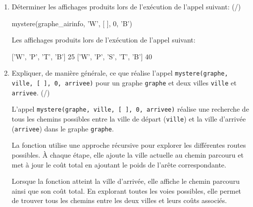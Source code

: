 \begin{enumerate}[resume=monDS]
    \item Déterminer les affichages produits lors de l'exécution de l'appel suivant: (/)
\begin{CodePythontexAlt}[TaillePolice=\large, Largeur=1\linewidth,Centre,Lignes=true,PremLigne=1]{}
mystere(graphe_airinfo, 'W', [ ], 0, 'B')
\end{CodePythontexAlt}
\begin{blocvisible}[height=3]
    Les affichages produits lors de l'exécution de l'appel suivant:
\begin{CodePythontexAlt}[TaillePolice=\large, Largeur=1\linewidth,Centre,Lignes=true,PremLigne=1]{}
['W', 'P', 'T', 'B'] 25
['W', 'P', 'S', 'T', 'B'] 40
\end{CodePythontexAlt}
\end{blocvisible}

\medskip

\item Expliquer, de manière générale, ce que réalise l'appel \texttt{mystere(graphe, ville, [ ], 0, arrivee)} pour un graphe \texttt{graphe} et deux villes \texttt{ville} et \texttt{arrivee}. (/)
\begin{blocvisible}[height=5]
    L'appel \texttt{mystere(graphe, ville, [ ], 0, arrivee)} réalise une recherche de tous les chemins possibles entre la ville de départ (\texttt{ville}) et la ville d'arrivée (\texttt{arrivee}) dans le graphe \texttt{graphe}. 

    La fonction utilise une approche récursive pour explorer les différentes routes possibles. À chaque étape, elle ajoute la ville actuelle au chemin parcouru et met à jour le coût total en ajoutant le poids de l'arête correspondante. 

    Lorsque la fonction atteint la ville d'arrivée, elle affiche le chemin parcouru ainsi que son coût total. En explorant toutes les voies possibles, elle permet de trouver tous les chemins entre les deux villes et leurs coûts associés.
\end{blocvisible}


\end{enumerate}
            
